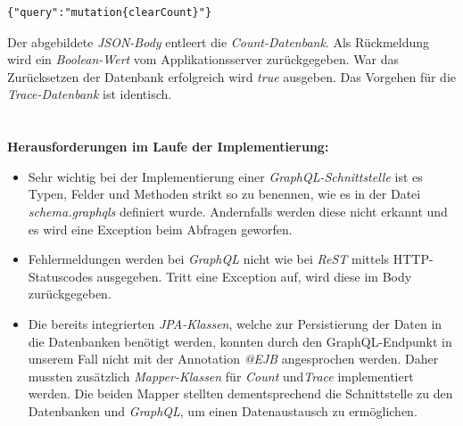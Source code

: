 \documentclass[10pt,journal,compsoc]{IEEEtran}
\begin{document}
\begin{lstlisting}
{"query":"mutation{clearCount}"}
\end{lstlisting}
Der abgebildete \textit{JSON-Body} entleert die \textit{Count-Datenbank}. Als Rückmeldung wird ein \textit{Boolean-Wert} vom Applikationsserver zurückgegeben. War das Zurücksetzen der Datenbank erfolgreich wird \textit{true} ausgeben. Das Vorgehen für die \textit{Trace-Datenbank} ist identisch.\\ \\ \\
\textbf{Herausforderungen im Laufe der Implementierung:}
\begin{itemize}
	\item Sehr wichtig bei der Implementierung einer \textit{GraphQL-Schnittstelle} ist es Typen, Felder und Methoden strikt so zu benennen, wie es in der Datei \textit{schema.graphqls} definiert wurde. Andernfalls werden diese nicht erkannt und es wird eine Exception beim Abfragen geworfen. 
\end{itemize}
\begin{itemize}
	\item Fehlermeldungen werden bei \textit{GraphQL} nicht wie bei \textit{ReST} mittels HTTP-Statuscodes ausgegeben. Tritt eine Exception auf, wird diese im Body zurückgegeben.  
\end{itemize}
\begin{itemize}
	\item Die bereits integrierten \textit{JPA-Klassen}, welche zur Persistierung der Daten in die Datenbanken benötigt werden, konnten durch den GraphQL-Endpunkt in unserem Fall nicht mit der Annotation \textit{@EJB} angesprochen werden. Daher mussten zusätzlich \textit{Mapper-Klassen} für \textit{Count} und\textit{Trace} implementiert werden. Die beiden Mapper stellten dementsprechend die Schnittstelle zu den Datenbanken und  \textit{GraphQL}, um einen Datenaustausch zu ermöglichen.
\end{itemize}
\end{document}
